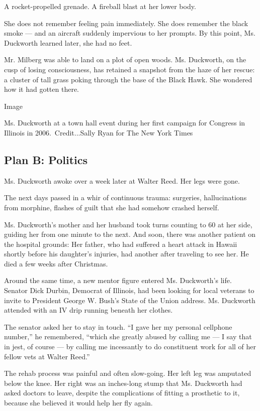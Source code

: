 A rocket-propelled grenade. A fireball blast at her lower body.

She does not remember feeling pain immediately. She does remember the
black smoke --- and an aircraft suddenly impervious to her prompts. By
this point, Ms. Duckworth learned later, she had no feet.

Mr. Milberg was able to land on a plot of open woods. Ms. Duckworth, on
the cusp of losing consciousness, has retained a snapshot from the haze
of her rescue: a cluster of tall grass poking through the base of the
Black Hawk. She wondered how it had gotten there.

Image

Ms. Duckworth at a town hall event during her first campaign for
Congress in Illinois in 2006.~Credit...Sally Ryan for The New York Times

\hypertarget{plan-b-politics}{%
\subsection{Plan B: Politics}\label{plan-b-politics}}

Ms. Duckworth awoke over a week later at Walter Reed. Her legs were
gone.

The next days passed in a whir of continuous trauma: surgeries,
hallucinations from morphine, flashes of guilt that she had somehow
crashed herself.

Ms. Duckworth's mother and her husband took turns counting to 60 at her
side, guiding her from one minute to the next. And soon, there was
another patient on the hospital grounds: Her father, who had suffered a
heart attack in Hawaii shortly before his daughter's injuries, had
another after traveling to see her. He died a few weeks after Christmas.

Around the same time, a new mentor figure entered Ms. Duckworth's life.
Senator Dick Durbin, Democrat of Illinois, had been looking for local
veterans to invite to President George W. Bush's State of the Union
address. Ms. Duckworth attended with an IV drip running beneath her
clothes.

The senator asked her to stay in touch. ``I gave her my personal
cellphone number,'' he remembered, ``which she greatly abused by calling
me --- I say that in jest, of course --- by calling me incessantly to do
constituent work for all of her fellow vets at Walter Reed.''

The rehab process was painful and often slow-going. Her left leg was
amputated below the knee. Her right was an inches-long stump that Ms.
Duckworth had asked doctors to leave, despite the complications of
fitting a prosthetic to it, because she believed it would help her fly
again.

